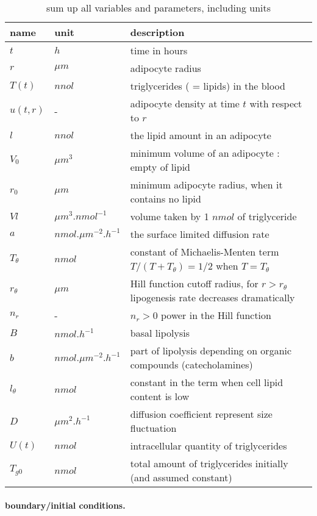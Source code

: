 \documentclass[11pt,a4paper]{article}
\begin{document}
\begin{table}
\begin{tabular}{l|l|l}
name & unit & description \\
\hline 
$t$ & $h$ & time in hours \\
$r$ & $\mu m$ & adipocyte radius \\
$T(t)$ &  $nnol$ & triglycerides ( = lipids) in the blood \\
$u(t,r)$ & - & adipocyte density at time $t$ with respect to $r$ \\
$l$ & $nnol$ & the lipid amount in an adipocyte \\
$V_0$ & $\mu m ^3$ & minimum volume of an adipocyte : empty of lipid \\
$r_0$ & $\mu m$ & minimum adipocyte radius, when it contains no lipid \\
$Vl$ &  $\mu m ^3 . nmol^{-1}$ & volume taken by 1 $nmol$ of triglyceride \\ 
$a$ & $nmol. \mu m ^{-2} . h^{-1}$ & the surface limited diffusion rate  \\
$T_{\theta}$ & $nmol$ & constant of Michaelis-Menten term $T/(T+T_{\theta}) = 1/2$ when $T = T_{\theta}$ \\
$r_{\theta}$ & $\mu m$ & Hill function cutoff radius, for $r > r_{\theta}$ lipogenesis rate decreases dramatically \\
$n_r$ & - & $n_r > 0$ power in the Hill function \\
$B$ & $nmol . h^{-1}$ & basal lipolysis \\
$b$ & $nmol .\mu m ^{-2} . h^{-1}$ & part of lipolysis depending on organic compounds (catecholamines) \\
$l_{\theta}$ & $nmol$ & constant in the term when cell lipid content is low \\
$D$ & $\mu m^2 . h^{-1}$ & diffusion coefficient represent size fluctuation \\
$U(t)$ & $nmol$ & intracellular quantity of triglycerides \\
$T_{g0}$ & $nmol$ & total amount of triglycerides initially (and assumed constant)
\end{tabular}\caption{sum up all variables and parameters, including units} \label{Tab:VarParUnits}
\end{table}

\paragraph{boundary/initial conditions.}
\end{document}
